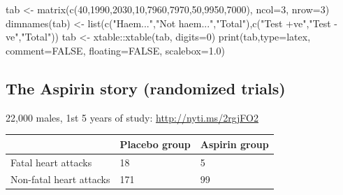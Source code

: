 \documentclass[
  10pt,
  b5paper]{book}
\newenvironment{Shaded}{\begin{snugshade}}{\end{snugshade}}
\newcommand{\AttributeTok}[1]{\textcolor[rgb]{0.77,0.63,0.00}{#1}}
\newcommand{\ConstantTok}[1]{\textcolor[rgb]{0.00,0.00,0.00}{#1}}
\newcommand{\DecValTok}[1]{\textcolor[rgb]{0.00,0.00,0.81}{#1}}
\newcommand{\FloatTok}[1]{\textcolor[rgb]{0.00,0.00,0.81}{#1}}
\newcommand{\FunctionTok}[1]{\textcolor[rgb]{0.00,0.00,0.00}{#1}}
\newcommand{\NormalTok}[1]{#1}
\newcommand{\OtherTok}[1]{\textcolor[rgb]{0.56,0.35,0.01}{#1}}
\newcommand{\SpecialCharTok}[1]{\textcolor[rgb]{0.00,0.00,0.00}{#1}}
\newcommand{\StringTok}[1]{\textcolor[rgb]{0.31,0.60,0.02}{#1}}
\begin{document}
\begin{Shaded}
\begin{Highlighting}[]
\NormalTok{tab }\OtherTok{\textless{}{-}} \FunctionTok{matrix}\NormalTok{(}\FunctionTok{c}\NormalTok{(}\DecValTok{40}\NormalTok{,}\DecValTok{1990}\NormalTok{,}\DecValTok{2030}\NormalTok{,}\DecValTok{10}\NormalTok{,}\DecValTok{7960}\NormalTok{,}\DecValTok{7970}\NormalTok{,}\DecValTok{50}\NormalTok{,}\DecValTok{9950}\NormalTok{,}\DecValTok{7000}\NormalTok{), }\AttributeTok{ncol=}\DecValTok{3}\NormalTok{, }\AttributeTok{nrow=}\DecValTok{3}\NormalTok{)}
\FunctionTok{dimnames}\NormalTok{(tab) }\OtherTok{\textless{}{-}} \FunctionTok{list}\NormalTok{(}\FunctionTok{c}\NormalTok{(}\StringTok{"Haem..."}\NormalTok{,}\StringTok{"Not haem..."}\NormalTok{,}\StringTok{"Total"}\NormalTok{),}\FunctionTok{c}\NormalTok{(}\StringTok{"Test +ve"}\NormalTok{,}\StringTok{"Test {-}ve"}\NormalTok{,}\StringTok{"Total"}\NormalTok{))}
\NormalTok{tab }\OtherTok{\textless{}{-}}\NormalTok{ xtable}\SpecialCharTok{::}\FunctionTok{xtable}\NormalTok{(tab, }\AttributeTok{digits=}\DecValTok{0}\NormalTok{)}
\FunctionTok{print}\NormalTok{(tab,}\AttributeTok{type=}\StringTok{\textquotesingle{}latex\textquotesingle{}}\NormalTok{, }\AttributeTok{comment=}\ConstantTok{FALSE}\NormalTok{, }\AttributeTok{floating=}\ConstantTok{FALSE}\NormalTok{, }\AttributeTok{scalebox=}\FloatTok{1.0}\NormalTok{)}
\end{Highlighting}
\end{Shaded}


\hypertarget{the-aspirin-story-randomized-trials}{%
\subsection*{The Aspirin story (randomized trials)}\label{the-aspirin-story-randomized-trials}}

22,000 males, 1st 5 years of study: \url{http://nyti.ms/2rgjFO2}

\begin{longtable}[]{@{}lll@{}}
\toprule
& Placebo group & Aspirin group \\
\midrule
\endhead
Fatal heart attacks & 18 & 5 \\
Non-fatal heart attacks & 171 & 99 \\
\bottomrule
\end{longtable}
\end{document}
